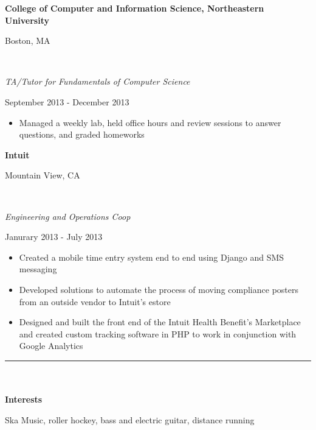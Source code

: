 \documentclass[14pt]{article}
\newcommand\textboxhalf[1]{%
  \parbox{.5\textwidth}{#1}%
}
\newcommand\textboxquarter[1]{%
  \parbox{.25\textwidth}{#1}%
}
\newcommand\textboxthreequarter[1]{%
  \parbox{.75\textwidth}{#1}%
}
\begin{document}
\noindent\textboxthreequarter{\textbf{College of Computer and Information Science, Northeastern University\hfill}}\textboxquarter{\hfill Boston, MA}
\\
\noindent\textboxhalf{\textit{TA/Tutor for Fundamentals of Computer Science}\hfill}\textboxhalf{\hfill September 2013 - December 2013}
\begin{itemize} [noitemsep, nolistsep]
\item Managed a weekly lab, held office hours and review sessions to answer questions, and graded homeworks
\end{itemize}

\noindent\textboxthreequarter{\textbf{Intuit\hfill}}\textboxquarter{\hfill Mountain View, CA}
\\
\noindent\textboxthreequarter{\textit{Engineering and Operations Coop}\hfill}\textboxquarter{\hfill Janurary 2013 - July 2013}
\begin{itemize} [noitemsep, nolistsep]
\item Created a mobile time entry system end to end using Django and SMS messaging
\item Developed solutions to automate the process of moving compliance posters from an outside vendor to Intuit’s estore
\item Designed and built the front end of the Intuit Health Benefit’s Marketplace and created custom tracking software in PHP to work in conjunction with Google Analytics
\end{itemize}

\noindent\rule{19.0cm}{0.4pt}
\\
\\
\noindent\textbf{\Large{Interests}}
\\
\textboxquarter{\hfill}\textboxthreequarter{Ska Music, roller hockey, bass and electric guitar, distance running}
\end{document}
